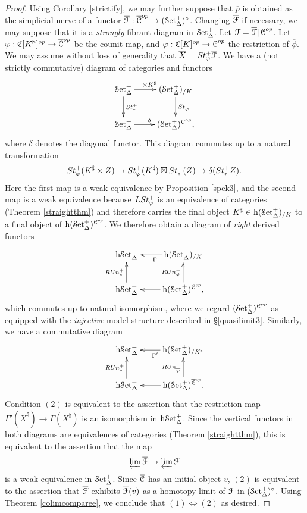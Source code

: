 \begin{proof}
Using Corollary \ref{strictify}, we may further suppose that $\overline{p}$ is obtained as the simplicial nerve of a functor $\overline{\operatorname{\mathcal{F}}}: \overline{\operatorname{\mathcal{C}}}^{op} \rightarrow (\operatorname{\mathcal{S}et_{\Delta}^{+}})^{\circ}$. 
Changing $\overline{\operatorname{\mathcal{F}}}$ if necessary, we may suppose that it is a {\em strongly} fibrant
diagram in $\operatorname{\mathcal{S}et_{\Delta}^{+}}$. Let $\operatorname{\mathcal{F}} = \overline{\operatorname{\mathcal{F}}}|\operatorname{\mathcal{C}}^{op}$. 
Let $\overline{\varphi}: \operatorname{\mathfrak{C}}[K^{\triangleright}]^{op} \rightarrow \overline{\operatorname{\mathcal{C}}}^{op}$
be the counit map, and $\varphi: \operatorname{\mathfrak{C}}[K]^{op} \rightarrow \operatorname{\mathcal{C}}^{op}$ the restriction of $\overline{\phi}$. We may assume without loss of generality that $\overline{X} = St^{+}_{\varphi} \overline{\operatorname{\mathcal{F}}}$. We have a (not strictly commutative) diagram of categories and functors
$$ \xymatrix{ \mSet \ar[d]^{\St^{+}_{\ast}} \ar[r]^{\times K^{\sharp}} & (\mSet)_{/K} \ar[d]^{\St^{+}_{\phi}} \\
\mSet \ar[r]^{\delta} & (\mSet)^{\calC^{op}}, }$$
where $\delta$ denotes the diagonal functor. This diagram commutes up to a natural transformation
$$ St^{+}_{\varphi}( K^{\sharp} \times Z) \rightarrow
St^{+}_{\varphi}(K^{\sharp}) \boxtimes St^{+}_{\ast}(Z) \rightarrow \delta( St^{+}_{\ast} Z ).$$
Here the first map is a weak equivalence by Proposition \ref{spek3}, and the second map is a weak  equivalence because $L St^{+}_{\varphi}$ is an equivalence of categories (Theorem \ref{straightthm}) and therefore carries the final object $K^{\sharp} \in \rm{h} \it{(\operatorname{\mathcal{S}et_{\Delta}^{+}})_{/K}}$ to a final object of
$\rm{h} \it{(\operatorname{\mathcal{S}et_{\Delta}^{+}})^{\operatorname{\mathcal{C}}^{op}}}$. We therefore obtain a diagram of {\em right} derived functors
$$ \xymatrix{ \h{\mSet} & \h{(\mSet)_{/K}} \ar[l]^{\Gamma} \\
\h{\mSet} \ar[u]^{R \Un^{+}_{\ast}} & \h{(\mSet)^{\calC^{op}}} \ar[l] \ar[u]^{R \Un^{+}_{\phi}}, }$$
which commutes up to natural isomorphism, where we regard $(\operatorname{\mathcal{S}et_{\Delta}^{+}})^{\operatorname{\mathcal{C}}^{op}}$ as equipped with the {\em injective} model structure described in \S \ref{quasilimit3}. Similarly, we have a commutative diagram
$$ \xymatrix{ \h{\mSet}& \h{(\mSet)_{/K^{\triangleright}}} \ar[l]^{\Gamma'} \\
\h{\mSet} \ar[u]^{R \Un^{+}_{\ast}} & \h{(\mSet)^{\overline{\calC}^{op}}} \ar[l] \ar[u]^{R \Un^{+}_{\overline{\phi}}}. }$$
Condition $(2)$ is equivalent to the assertion that the restriction map
$\Gamma'(\overline{X}^{\natural}) \rightarrow \Gamma(X^{\natural})$ is an isomorphism in
$\rm{h} \it{\operatorname{\mathcal{S}et_{\Delta}^{+}}}$. Since the vertical functors in both diagrams are equivalences of categories (Theorem \ref{straightthm}), this is equivalent to the assertion that the map
$$ \varprojlim \overline{\operatorname{\mathcal{F}}} \rightarrow \varprojlim \operatorname{\mathcal{F}}$$
is a weak equivalence in $\operatorname{\mathcal{S}et_{\Delta}^{+}}$. Since $\overline{\operatorname{\mathcal{C}}}$ has an initial object $v$, $(2)$ is equivalent to the assertion that $\overline{\operatorname{\mathcal{F}}}$ exhibits $\overline{\operatorname{\mathcal{F}}}(v)$ as a homotopy limit
of $\operatorname{\mathcal{F}}$ in $(\operatorname{\mathcal{S}et_{\Delta}^{+}})^{\circ}$. Using Theorem \ref{colimcomparee}, we conclude that
$(1) \Leftrightarrow (2)$ as desired.
\end{proof}

